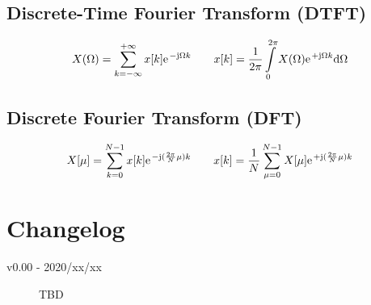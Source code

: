 \documentclass[landscape,columns=4]{cheatsheet}
\begin{document}
\subsection{Discrete-Time Fourier Transform (DTFT)}
%
\begin{align*}
X(\Omega) = \sum\limits_{k=-\infty}^{+\infty} x[k] \e^{-\im \Omega k}
\qquad
x[k] = \frac{1}{2\pi}\int\limits_{0}^{2\pi} X(\Omega) \e^{+\im \Omega k}\mathrm{d}\Omega
\end{align*}

\subsection{Discrete Fourier Transform (DFT)}
%
\begin{align*}
X[\mu] = \sum\limits_{k=0}^{N-1} x[k] \e^{-\im (\frac{2\pi}{N} \mu) k}
\qquad
x[k] = \frac{1}{N}\sum\limits_{\mu=0}^{N-1} X[\mu] \e^{+\im (\frac{2\pi}{N} \mu) k}
\end{align*}

\section{Changelog}
\begin{description}
\item[v0.00 - 2020/xx/xx] TBD
\end{description}
\end{document}
